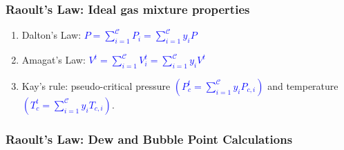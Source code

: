 \documentclass[10pt,compress,unknownkeysallowed]{beamer}
\begin{document}
\begin{frame}
  \frametitle{Raoult's Law: Ideal gas mixture properties}
  \begin{enumerate}
      \item<1-> Dalton's Law: \textcolor{blue}{$P=\sum\limits_{i=1}^{\mathcal{C}}P_{i}=\sum\limits_{i=1}^{\mathcal{C}}y_{i}P$}
      \item<2-> Amagat's Law: \textcolor{blue}{$V^{t}=\sum\limits_{i=1}^{\mathcal{C}}V_{i}^{t} = \sum\limits_{i=1}^{\mathcal{C}} y_{i}V^{t}$}
      \item<3-> Kay's rule: pseudo-critical pressure \textcolor{blue}{$\left(P_{c}^{t}=\sum\limits_{i=1}^{\mathcal{C}}y_{i}P_{c,i}\right)$} and temperature \textcolor{blue}{$\left(T_{c}^{t}=\sum\limits_{i=1}^{\mathcal{C}}y_{i}T_{c,i}\right)$}. 
  \end{enumerate}
\end{frame}

\begin{frame}
  \frametitle{Raoult's Law: Dew and Bubble Point Calculations}
         
\end{frame}
\end{document}
